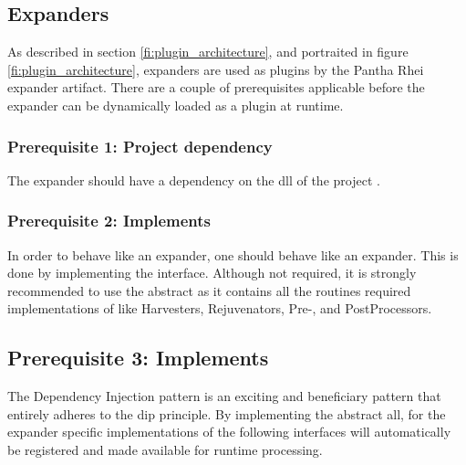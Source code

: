 \subsection{Expanders} \label{subsec_expanders}

As described in section \ref{fi:plugin_architecture}, and portraited in figure
\ref{fi:plugin_architecture}, expanders are used as plugins by the Pantha Rhei expander
artifact. There are a couple of prerequisites applicable before the expander can be
dynamically loaded as a plugin at runtime.

\subsubsection*{Prerequisite 1: Project dependency}
The expander should have a dependency on the \gls{dll} of the project
.

\subsubsection*{Prerequisite 2: Implements } In order
to behave like an expander, one should behave like an expander. This is done by
implementing the  interface. Although not
required, it is strongly recommended to use the abstract
 as it contains all the routines required
implementations of  like Harvesters,
Rejuvenators, Pre-, and PostProcessors.

\subsection*{Prerequisite 3: Implements
}
The Dependency Injection pattern is an exciting and beneficiary pattern that entirely 
adheres to the \gls{dip} principle. By implementing the abstract
 all, for the expander
specific implementations of the following interfaces will automatically be registered and
made available for runtime processing.


